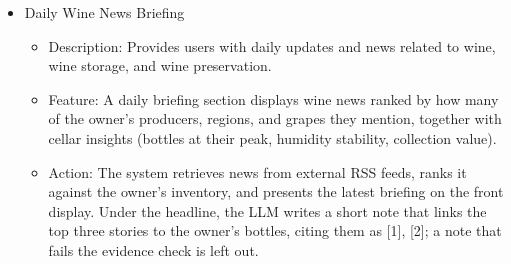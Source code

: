 \documentclass[conference]{IEEEtran}
\begin{document}
\begin{itemize}
    \item Daily Wine News Briefing
    \begin{itemize}
        \item Description: Provides users with daily updates and news related to wine, wine storage, and wine preservation.
        \item Feature: A daily briefing section displays wine news ranked by how many of the owner's producers, regions, and grapes they mention, together with cellar insights (bottles at their peak, humidity stability, collection value).
        \item Action: The system retrieves news from external RSS feeds, ranks it against the owner's inventory, and presents the latest briefing on the front display. Under the headline, the LLM writes a short note that links the top three stories to the owner's bottles, citing them as [1], [2]; a note that fails the evidence check is left out.
    \end{itemize}
\end{itemize}
\end{document}
